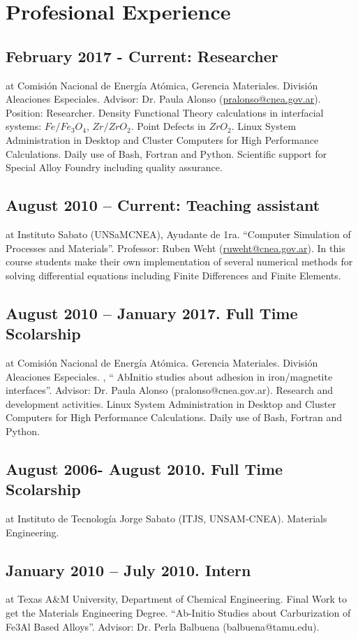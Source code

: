 \documentclass{my_cv}
\begin{document}
\section{Profesional Experience}

\subsection{February 2017 - Current: Researcher} at Comisión Nacional de Energía Atómica,  Gerencia Materiales. División Aleaciones Especiales. \textbf{} Advisor: Dr. Paula Alonso (\url{pralonso@cnea.gov.ar}). Position: Researcher. Density Functional Theory calculations in interfacial systems: $Fe / Fe_3O_4$, $Zr/ZrO_2$. Point Defects in $ZrO_2$. Linux System Administration in Desktop and Cluster Computers for High Performance Calculations. Daily use of Bash, Fortran and Python. Scientific support for Special Alloy Foundry including quality assurance.

\subsection{August 2010 – Current: Teaching assistant} at Instituto Sabato (UNSaM\-CNEA), Ayudante de 1ra. “Computer Simulation of Processes and Materials”. Professor: Ruben Weht (\url{ruweht@cnea.gov.ar}). In this course students make their own implementation of several numerical methods for solving differential equations including Finite Differences and Finite Elements.

\subsection{August 2010 – January 2017. Full Time Scolarship} at Comisión Nacional de Energía Atómica. Gerencia Materiales. División Aleaciones Especiales. , “ Ab\-Initio studies about adhesion in iron/magnetite interfaces”. Advisor: Dr. Paula Alonso (pralonso@cnea.gov.ar). Research and development activities. Linux System Administration in Desktop and Cluster Computers for High Performance Calculations. Daily use of Bash, Fortran and Python. 

\subsection{August 2006- August 2010. Full Time Scolarship } at Instituto de Tecnología Jorge Sabato (ITJS, UNSAM-CNEA). Materials Engineering. 

\subsection{January 2010 – July 2010. Intern } at Texas A\&M University, Department of Chemical Engineering. Final Work to get the Materials Engineering Degree. “Ab-Initio Studies about Carburization of Fe3Al Based Alloys”. Advisor: Dr. Perla Balbuena (balbuena@tamu.edu). 
\end{document}

